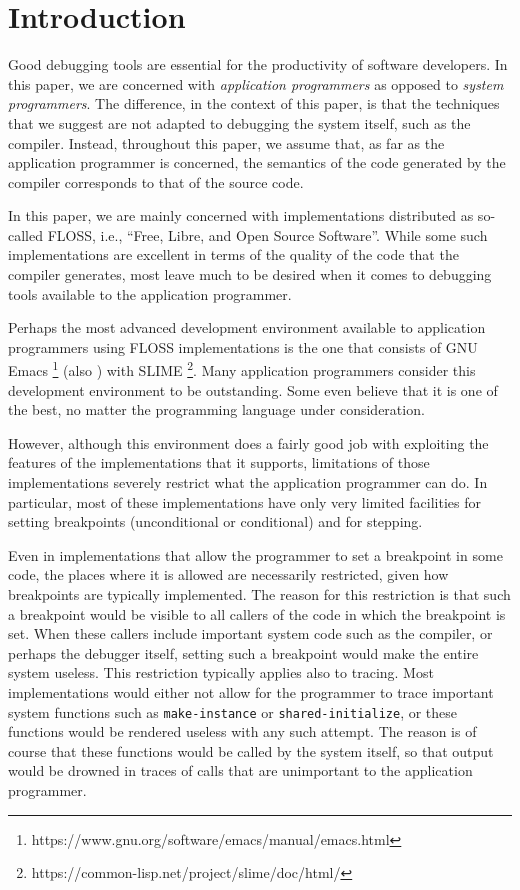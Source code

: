 \section{Introduction}
\label{sec-introduction}

Good debugging tools are essential for the productivity of software
developers.  In this paper, we are concerned with \emph{application
  programmers} as opposed to \emph{system programmers}.  The
difference, in the context of this paper, is that the techniques that
we suggest are not adapted to debugging the system itself, such as the
compiler.  Instead, throughout this paper, we assume that, as far as
the application programmer is concerned, the semantics of the code
generated by the compiler corresponds to that of the source code.

In this paper, we are mainly concerned with \commonlisp{}
\cite{ansi:common:lisp} implementations distributed as so-called
FLOSS, i.e., ``Free, Libre, and Open Source Software''.  While some
such implementations are excellent in terms of the quality of the code
that the compiler generates, most leave much to be desired when it
comes to debugging tools available to the application programmer.

Perhaps the most advanced development environment available to
application programmers using FLOSS \commonlisp{} implementations is
the one that consists of GNU Emacs%
\footnote{https://www.gnu.org/software/emacs/manual/emacs.html}
(also \cite{10.5555:2167272} \cite{Stallman:emacs})
with SLIME%
\footnote{https://common-lisp.net/project/slime/doc/html/}.
Many application
programmers consider this development environment to be outstanding.
Some even believe that it is one of the best, no matter the
programming language under consideration.

However, although this environment does a fairly good job with
exploiting the features of the \commonlisp{} implementations that it
supports, limitations of those implementations severely restrict what
the application programmer can do.  In particular, most of these
implementations have only very limited facilities for setting
breakpoints (unconditional or conditional) and for stepping.

Even in implementations that allow the programmer to set a breakpoint
in some code, the places where it is allowed are necessarily
restricted, given how breakpoints are typically implemented.  The
reason for this restriction is that such a breakpoint would be visible
to all callers of the code in which the breakpoint is set.  When these
callers include important system code such as the compiler, or perhaps
the debugger itself, setting such a breakpoint would make the entire
system useless.  This restriction typically applies also to tracing.
Most \commonlisp{} implementations would either not allow for the
programmer to trace important system functions such as
\texttt{make-instance} or \texttt{shared-initialize}, or these
functions would be rendered useless with any such attempt.  The reason
is of course that these functions would be called by the system
itself, so that output would be drowned in traces of calls that are
unimportant to the application programmer.

